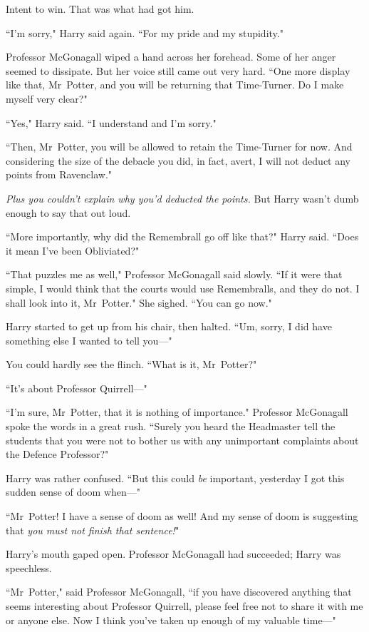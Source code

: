 Intent to win. That was what had got him.

``I'm sorry," Harry said again. ``For my pride and my stupidity."

Professor McGonagall wiped a hand across her forehead. Some of her anger seemed to dissipate. But her voice still came out very hard. ``One more display like that, Mr~Potter, and you will be returning that Time-Turner. Do I make myself very clear?"

``Yes," Harry said. ``I understand and I'm sorry."

``Then, Mr~Potter, you will be allowed to retain the Time-Turner for now. And considering the size of the debacle you did, in fact, avert, I will not deduct any points from Ravenclaw."

\emph{Plus you couldn't explain why you'd deducted the points.} But Harry wasn't dumb enough to say that out loud.

``More importantly, why did the Remembrall go off like that?" Harry said. ``Does it mean I've been Obliviated?"

``That puzzles me as well," Professor McGonagall said slowly. ``If it were that simple, I would think that the courts would use Remembralls, and they do not. I shall look into it, Mr~Potter." She sighed. ``You can go now."

Harry started to get up from his chair, then halted. ``Um, sorry, I did have something else I wanted to tell you—"

You could hardly see the flinch. ``What is it, Mr~Potter?"

``It's about Professor Quirrell—"

``I'm sure, Mr~Potter, that it is nothing of importance." Professor McGonagall spoke the words in a great rush. ``Surely you heard the Headmaster tell the students that you were not to bother us with any unimportant complaints about the Defence Professor?"

Harry was rather confused. ``But this could \emph{be} important, yesterday I got this sudden sense of doom when—"

``Mr~Potter! I have a sense of doom as well! And my sense of doom is suggesting that \emph{you must not finish that sentence!}"

Harry's mouth gaped open. Professor McGonagall had succeeded; Harry was speechless.

``Mr~Potter," said Professor McGonagall, ``if you have discovered anything that seems interesting about Professor Quirrell, please feel free not to share it with me or anyone else. Now I think you've taken up enough of my valuable time—"

